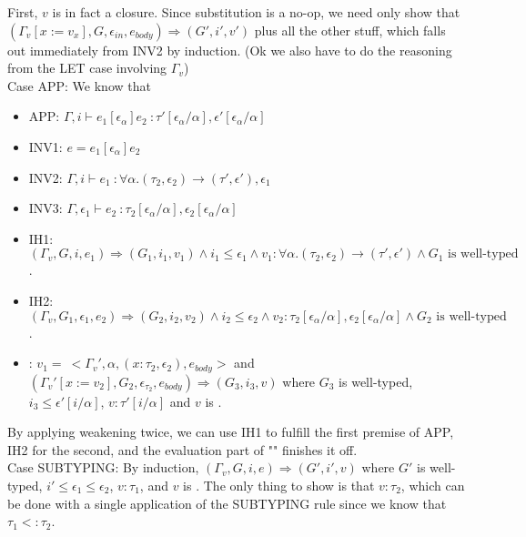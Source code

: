 \documentclass{article}
\begin{document}
First, $v$ is in fact a closure. Since substitution is a no-op, we need only show that $(\Gamma_v[x := v_x], G, \epsilon_{in}, e_{body}) \Rightarrow (G', i', v')$ plus all the other stuff, which falls out immediately from INV2 by induction. (Ok we also have to do the reasoning from the LET case involving $\Gamma_v$)
\\

Case APP: We know that
\begin{itemize}
	\item APP: $\Gamma, i \vdash e_1[\epsilon_\alpha] e_2\ \colon \tau'[\epsilon_\alpha/\alpha], \epsilon'[\epsilon_\alpha/\alpha]$
	\item INV1: $e = e_1[\epsilon_\alpha] e_2$
	\item INV2: $\Gamma, i \vdash e_1\ \colon \forall\alpha.(\tau_2, \epsilon_2) \rightarrow (\tau', \epsilon'), \epsilon_1$
	\item INV3: $\Gamma, \epsilon_1 \vdash e_2\ \colon \tau_2[\epsilon_\alpha/\alpha], \epsilon_2[\epsilon_\alpha/\alpha]$
	\item IH1: $(\Gamma_v, G, i, e_1) \Rightarrow (G_1, i_1, v_1) \wedge i_1 \leq \epsilon_1 \wedge v_1 : \forall\alpha.(\tau_2, \epsilon_2) \rightarrow (\tau', \epsilon') \wedge G_1 \mbox{ is well-typed}$.
	\item IH2: $(\Gamma_v, G_1, \epsilon_1, e_2) \Rightarrow (G_2, i_2, v_2) \wedge i_2 \leq \epsilon_2 \wedge v_2 : \tau_2[\epsilon_\alpha/\alpha], \epsilon_2[\epsilon_\alpha/\alpha] \wedge G_2 \mbox{ is well-typed}$.
	\item \okvalue: $v_1 =\ <\Gamma_v', \alpha, (x : \tau_2, \epsilon_2), e_{body}>$ and $(\Gamma_v'[x := v_2], G_2, \epsilon_{\tau_2}, e_{body}) \Rightarrow (G_3, i_3, v)$ where $G_3$ is well-typed, $i_3 \leq \epsilon'[i/\alpha]$, $v : \tau'[i/\alpha]$ and $v$ is \okvalue.
\end{itemize}
By applying weakening twice, we can use IH1 to fulfill the first premise of APP, IH2 for the second, and the evaluation part of "\okvalue" finishes it off.
\\

Case SUBTYPING: 
By induction, $(\Gamma_v, G, i, e) \Rightarrow (G', i', v)$ where $G'$ is well-typed, $i' \leq \epsilon_1 \leq \epsilon_2$, $v : \tau_1$, and $v$ is \okvalue. The only thing to show is that $v : \tau_2$, which can be done with a single application of the SUBTYPING rule since we know that $\tau_1 <: \tau_2$.
\end{document}
